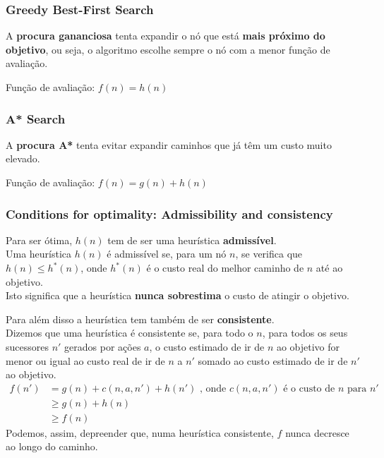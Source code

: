 \documentclass[11pt]{article}
\begin{document}
\subsubsection{Greedy Best-First Search}

A \textbf{procura gananciosa} tenta expandir o nó que está \textbf{mais próximo do objetivo}, ou seja, o algoritmo escolhe sempre o nó com a menor função de avaliação.\vspace{10pt}

Função de avaliação: $f(n) = h(n)$

\subsubsection{A* Search}

A \textbf{procura A*} tenta evitar expandir caminhos que já têm um custo muito elevado.\vspace{10pt}

Função de avaliação: $f(n) = g(n) + h(n)$

\subsubsection*{Conditions for optimality: Admissibility and consistency}

Para ser ótima, $h(n)$ tem de ser uma heurística \textbf{admissível}.\\
Uma heurística $h(n)$ é admissível se, para um nó $n$, se verifica que $h(n) \leq h^*(n)$, onde $h^*(n)$ é o custo real do melhor caminho de $n$ até ao objetivo.\\
Isto significa que a heurística \textbf{nunca sobrestima} o custo de atingir o objetivo.\vspace{4pt}

Para além disso a heurística tem também de ser \textbf{consistente}.\\
Dizemos que uma heurística é consistente se, para todo o $n$, para todos os seus sucessores $n'$ gerados por ações $a$, o custo estimado de ir de $n$ ao objetivo for menor ou igual ao custo real de ir de $n$ a $n'$ somado ao custo estimado de ir de $n'$ ao objetivo.
\begin{equation*}
\begin{split}
    f(n') & = g(n) + c(n,a,n') + h(n') \text{ , onde } c(n,a,n') 
                                       \text{ é o custo de } n 
                                       \text{ para } n' \\
          & \geq g(n) + h(n) \\
          & \geq f(n)
\end{split}
\end{equation*}
Podemos, assim, depreender que, numa heurística consistente, $f$ nunca decresce ao longo do caminho.
\end{document}
